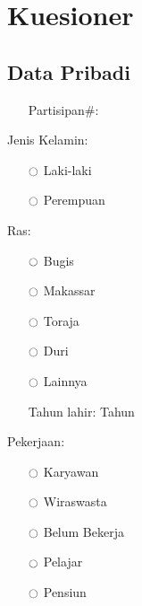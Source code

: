 




\section*{Kuesioner}
\subsection*{Data Pribadi}

\begin{itemize}
\item[Partisipan\#:]\underline{\hspace{2cm}}
\end{itemize}

Jenis Kelamin:
\begin{multicols}{2}
\begin{itemize}
\item[$\ocircle$] Laki-laki \item [$\ocircle$] Perempuan
\end{itemize}
\end{multicols}

Ras:
\begin{multicols}{3}
\begin{itemize}
\item[$\ocircle$] Bugis
\item[$\ocircle$] Makassar
\item[$\ocircle$] Toraja
\item[$\ocircle$] Duri
\item[$\ocircle$] Lainnya \underline{\hspace{2cm}}
\end{itemize}
\end{multicols}

\begin{itemize}
\item[Tahun lahir:] \underline{\hspace{2cm}} Tahun
\end{itemize}

Pekerjaan:
\begin{multicols}{3}
\begin{itemize}
\item[$\ocircle$] Karyawan
\item[$\ocircle$] Wiraswasta
\item[$\ocircle$] Belum Bekerja
\item[$\ocircle$] Pelajar
\item[$\ocircle$] Pensiun
\end{itemize}
\end{multicols}


